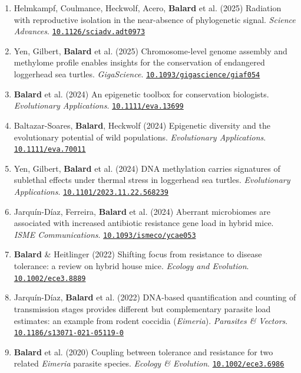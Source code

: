 \documentclass[letterpaper,12pt,oneside]{article}
\newcommand{\doi}[1]{\href{https://doi.org/#1}{\nolinkurl{#1}}}
\begin{document}
     {\begin{enumerate}\scriptsize\sloppy

      \item Helmkampf, Coulmance, Heckwolf, Acero, \textbf{Balard} et al. (2025) Radiation with reproductive isolation in the near-absence of phylogenetic signal. \textit{Science Advances}. \doi{10.1126/sciadv.adt0973}

     \item Yen, Gilbert, \textbf{Balard} et al. (2025) Chromosome-level genome assembly and methylome profile enables insights for the conservation of endangered loggerhead sea turtles. \textit{GigaScience}. \doi{10.1093/gigascience/giaf054}

     \item \textbf{Balard} et al. (2024) An epigenetic toolbox for conservation biologists. \textit{Evolutionary Applications}. \doi{10.1111/eva.13699}

     \item Baltazar-Soares, \textbf{Balard}, Heckwolf (2024) Epigenetic diversity and the evolutionary potential of wild populations. \textit{Evolutionary Applications}. \doi{10.1111/eva.70011}

     \item Yen, Gilbert, \textbf{Balard} et al. (2024) DNA methylation carries signatures of sublethal effects under thermal stress in loggerhead sea turtles. \textit{Evolutionary Applications}. \doi{10.1101/2023.11.22.568239}

     \item Jarqu\'in-D\'iaz, Ferreira, \textbf{Balard} et al. (2024) Aberrant microbiomes are associated with increased antibiotic resistance gene load in hybrid mice. \textit{ISME Communications}. \doi{10.1093/ismeco/ycae053}

     \item \textbf{Balard} \& Heitlinger (2022) Shifting focus from resistance to disease tolerance: a review on hybrid house mice. \textit{Ecology and Evolution}. \doi{10.1002/ece3.8889}

     \item Jarqu\'in-D\'iaz, \textbf{Balard} et al. (2022) DNA-based quantification and counting of transmission stages provides different but complementary parasite load estimates: an example from rodent coccidia (\textit{Eimeria}). \textit{Parasites \& Vectors}. \doi{10.1186/s13071-021-05119-0}

    \item \textbf{Balard} et al. (2020) Coupling between tolerance and resistance for two related \textit{Eimeria} parasite species. \textit{Ecology \& Evolution}. \doi{10.1002/ece3.6986}


\end{enumerate}}
\end{document}
